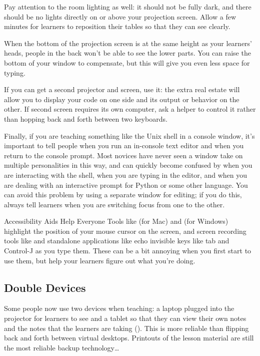 Pay attention to the room lighting as well:
it should not be fully dark, and there should be no lights directly
on or above your projection screen.
Allow a few minutes for learners to reposition their tables
so that they can see clearly.

When the bottom of the projection screen is at the same height as your learners' heads,
people in the back won't be able to see the lower parts.
You can raise the bottom of your window to compensate,
but this will give you even less space for typing.

If you can get a second projector and screen,
use it:
the extra real estate will allow you to display your code on one side
and its output or behavior on the other.
If second screen requires its own computer,
ask a helper to control it
rather than hopping back and forth between two keyboards.

Finally,
if you are teaching something like the Unix shell in a console window,
it's important to tell people when you run an in-console text editor
and when you return to the console prompt.
Most novices have never seen a window take on multiple personalities in this way,
and can quickly become confused by
when you are interacting with the shell,
when you are typing in the editor,
and when you are dealing with an interactive prompt for Python or some other language.
You can avoid this problem by using a separate window for editing;
if you do this,
always tell learners when you are switching focus from one to the other.

\begin{aside}{Accessibility Aids Help Everyone}
  Tools like  (for Mac)
  and  (for Windows)
  highlight the position of your mouse cursor on the screen,
  and screen recording tools like 
  and standalone applications like 
  echo invisible keys like tab and Control-J as you type them.
  These can be a bit annoying when you first start to use them,
  but help your learners figure out what you're doing.
\end{aside}

\subsection*{Double Devices}

Some people now use two devices when teaching:
a laptop plugged into the projector for learners to see
and a tablet so that they can view their own notes
and the notes that the learners are taking ().
This is more reliable than flipping back and forth between virtual desktops.
Printouts of the lesson material are still the most reliable backup technology{\ldots}

